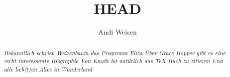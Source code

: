 \documentclass[DIV=calc,10pt,parskip=half,twocolumn]{scrartcl}
\author{Andi Weisen}
\begin{document}
\title{
\vspace{-1.5em}
	HEAD
\vspace{-2.5em}
}
\author{}
\date{}


\maketitle

\begin{abstract}\itshape %
  Bekanntlich schrieb \glqq Weizenbaum\grqq{} das Programm Eliza
Über Grace Hopper gibt es eine recht interessante Biographie
Von Knuth ist natürlich das \TeX{}-Buch zu zitieren
Und alle lieb(t)en \emph{Alice in Wonderland}
\end{abstract} 
\end{document}

